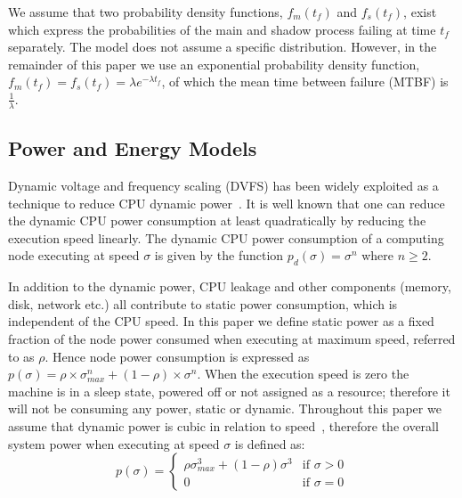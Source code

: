 
We assume that two probability density functions, $f_m(t_f)$ and
$f_s(t_f)$, exist which express the probabilities of the main and shadow
process failing at time $t_f$ separately. The model does not assume a
specific distribution. However, in the remainder of this paper we use
an exponential probability density function, $f_m(t_f)=f_s(t_f)=\lambda
e^{-\lambda t_f}$, of which the mean time between failure (MTBF) is $\frac{1}{\lambda}$.

\subsection{Power and Energy Models}
Dynamic voltage and frequency scaling
(DVFS) has
been widely exploited as a technique to reduce CPU dynamic power~\cite{flautner_2002_APS,pillai_2001_sosp}. It
is well known that one can reduce the dynamic CPU power consumption at
least quadratically by reducing the execution speed linearly. The
dynamic CPU power consumption of a computing node executing at speed
$\sigma$ is given by the function $p_d(\sigma)=\sigma^n$ where $n \ge
2$.

In addition to the dynamic power, CPU leakage and other components
(memory, disk, network etc.) all contribute to static power
consumption, which is independent of the CPU speed. In this paper we
define static power as a fixed fraction of the node power consumed
when executing at maximum speed, referred to as $\rho$. Hence node
power consumption is expressed as
$p(\sigma)=\rho \times \sigma_{max}^n + (1-\rho)\times \sigma^n$. When the execution speed is zero
the machine is in a sleep state, powered off or not assigned as a
resource; therefore it will not be consuming any power, static or
dynamic.  Throughout this paper we assume that dynamic power is cubic
in relation to
speed~\cite{rusu_2003_ecs,zhai_2004_dac}, therefore the
overall system power when executing at speed $\sigma$ is defined as:
\begin{equation}
p(\sigma) = \begin{cases} \rho \sigma_{max}^3 + (1-\rho) \sigma^3 & \mbox{if } \sigma > 0 \\ 
                          0 & \mbox{if } \sigma = 0 \end{cases}
\label{eq:power_model}
\end{equation}

